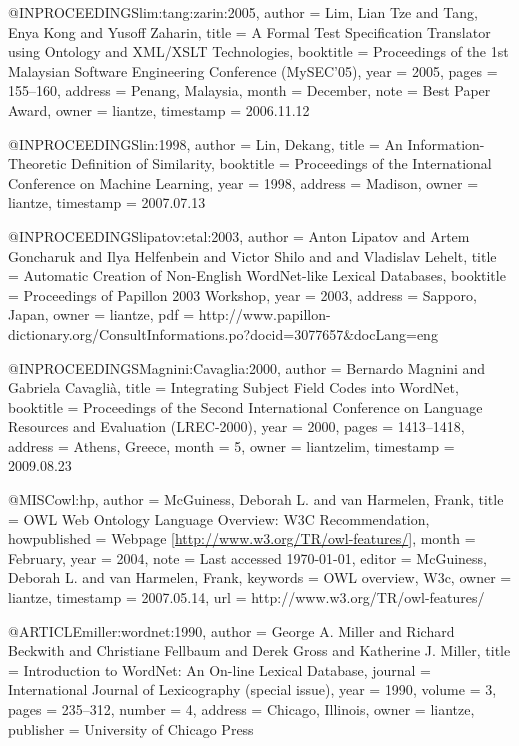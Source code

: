 @INPROCEEDINGS{lim:tang:zarin:2005,
  author = {Lim, Lian Tze and Tang, Enya Kong and Yusoff Zaharin},
  title = {A Formal Test Specification Translator using Ontology and {XML/XSLT}
	Technologies},
  booktitle = {Proceedings of the 1st Malaysian Software Engineering Conference
	(MySEC'05)},
  year = {2005},
  pages = {155--160},
  address = {Penang, Malaysia},
  month = {December},
  note = {Best Paper Award},
  owner = {liantze},
  timestamp = {2006.11.12}
}

@INPROCEEDINGS{lin:1998,
  author = {Lin, Dekang},
  title = {An Information-Theoretic Definition of Similarity},
  booktitle = {Proceedings of the International Conference on Machine Learning},
  year = {1998},
  address = {Madison},
  owner = {liantze},
  timestamp = {2007.07.13}
}

@INPROCEEDINGS{lipatov:etal:2003,
  author = {Anton Lipatov and Artem Goncharuk and Ilya Helfenbein and Victor
	Shilo and and Vladislav Lehelt},
  title = {Automatic Creation of Non-English WordNet-like Lexical Databases},
  booktitle = {Proceedings of Papillon 2003 Workshop},
  year = {2003},
  address = {Sapporo, Japan},
  owner = {liantze},
  pdf = {http://www.papillon-dictionary.org/ConsultInformations.po?docid=3077657&docLang=eng}
}

@INPROCEEDINGS{Magnini:Cavaglia:2000,
  author = {Bernardo Magnini and Gabriela Cavaglià},
  title = {Integrating Subject Field Codes into {W}ord{N}et},
  booktitle = {Proceedings of the {S}econd {I}nternational {C}onference on {L}anguage
	{R}esources and {E}valuation ({LREC}-2000)},
  year = {2000},
  pages = {1413--1418},
  address = {Athens, Greece},
  month = {5},
  owner = {liantzelim},
  timestamp = {2009.08.23}
}

@MISC{owl:hp,
  author = {McGuiness, Deborah L. and van Harmelen, Frank},
  title = {{OWL Web Ontology Language} Overview: {W3C} Recommendation},
  howpublished = {Webpage [\url{http://www.w3.org/TR/owl-features/}]},
  month = {February},
  year = {2004},
  note = {Last accessed \today},
  editor = {McGuiness, Deborah L. and van Harmelen, Frank},
  keywords = {OWL overview, W3c},
  owner = {liantze},
  timestamp = {2007.05.14},
  url = {http://www.w3.org/TR/owl-features/}
}

@ARTICLE{miller:wordnet:1990,
  author = {George A. Miller and Richard Beckwith and Christiane Fellbaum and
	Derek Gross and Katherine J. Miller},
  title = {Introduction to {WordNet}: An On-line Lexical Database},
  journal = {International Journal of Lexicography (special issue)},
  year = {1990},
  volume = {3},
  pages = {235--312},
  number = {4},
  address = {Chicago, Illinois},
  owner = {liantze},
  publisher = {University of Chicago Press}
}

